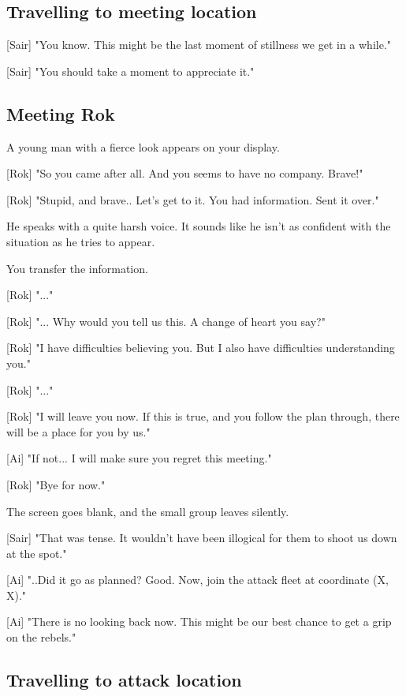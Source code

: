 \documentclass[a4paper,12pt]{article}
\begin{document}
\subsection{Travelling to meeting location}

[Sair] "You know. This might be the last moment of stillness we get in a while."

[Sair] "You should take a moment to appreciate it."

\subsection{Meeting Rok}

A young man with a fierce look appears on your display.

[Rok] "So you came after all. And you seems to have no company. Brave!"

[Rok] "Stupid, and brave.. Let's get to it. You had information. Sent it over."

He speaks with a quite harsh voice. It sounds like he isn't as confident with
the situation as he tries to appear. 

You transfer the information.

[Rok] "..."

[Rok] "... Why would you tell us this. A change of heart you say?" 

[Rok] "I have difficulties believing you. But I also have difficulties understanding you."

[Rok] "..."

[Rok] "I will leave you now. If this is true, and you follow the plan through,
there will be a place for you by us." 

[Ai] "If not... I will make sure you regret this meeting."

[Rok] "Bye for now."

The screen goes blank, and the small group leaves silently.

[Sair] "That was tense. It wouldn't have been illogical for them to shoot us down at the spot."

[Ai] "..Did it go as planned? Good. Now, join the attack fleet at coordinate (X, X)." 

[Ai] "There is no looking back now. This might be our best chance to get a grip on the rebels."

\subsection{Travelling to attack location}
\end{document}
